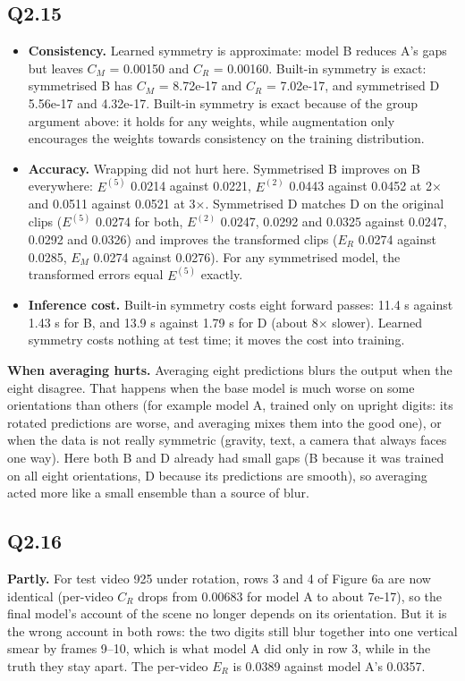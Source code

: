 \documentclass[11pt]{article}
\begin{document}
\subsection*{Q2.15}
\begin{itemize}
\item
  \textbf{Consistency.} Learned symmetry is approximate: model B reduces A's gaps but leaves \(C_M\) = 0.00150 and \(C_R\) = 0.00160. Built-in symmetry is exact: symmetrised B has \(C_M\) = 8.72e-17 and \(C_R\) = 7.02e-17, and symmetrised D 5.56e-17 and 4.32e-17. Built-in symmetry is exact because of the group argument above: it holds for any weights, while augmentation only encourages the weights towards consistency on the training distribution.
\item
  \textbf{Accuracy.} Wrapping did not hurt here. Symmetrised B improves on B everywhere: \(E^{(5)}\) 0.0214 against 0.0221, \(E^{(2)}\) 0.0443 against 0.0452 at 2× and 0.0511 against 0.0521 at 3×. Symmetrised D matches D on the original clips (\(E^{(5)}\) 0.0274 for both, \(E^{(2)}\) 0.0247, 0.0292 and 0.0325 against 0.0247, 0.0292 and 0.0326) and improves the transformed clips (\(E_R\) 0.0274 against 0.0285, \(E_M\) 0.0274 against 0.0276). For any symmetrised model, the transformed errors equal \(E^{(5)}\) exactly.
\item
  \textbf{Inference cost.} Built-in symmetry costs eight forward passes: 11.4 s against 1.43 s for B, and 13.9 s against 1.79 s for D (about 8× slower). Learned symmetry costs nothing at test time; it moves the cost into training.
\end{itemize}

\textbf{When averaging hurts.} Averaging eight predictions blurs the output when the eight disagree. That happens when the base model is much worse on some orientations than others (for example model A, trained only on upright digits: its rotated predictions are worse, and averaging mixes them into the good one), or when the data is not really symmetric (gravity, text, a camera that always faces one way). Here both B and D already had small gaps (B because it was trained on all eight orientations, D because its predictions are smooth), so averaging acted more like a small ensemble than a source of blur.


\subsection*{Q2.16}
\textbf{Partly.} For test video 925 under rotation, rows 3 and 4 of Figure 6a are now identical (per-video \(C_R\) drops from 0.00683 for model A to about 7e-17), so the final model's account of the scene no longer depends on its orientation. But it is the wrong account in both rows: the two digits still blur together into one vertical smear by frames 9--10, which is what model A did only in row 3, while in the truth they stay apart. The per-video \(E_R\) is 0.0389 against model A's 0.0357.
\end{document}
